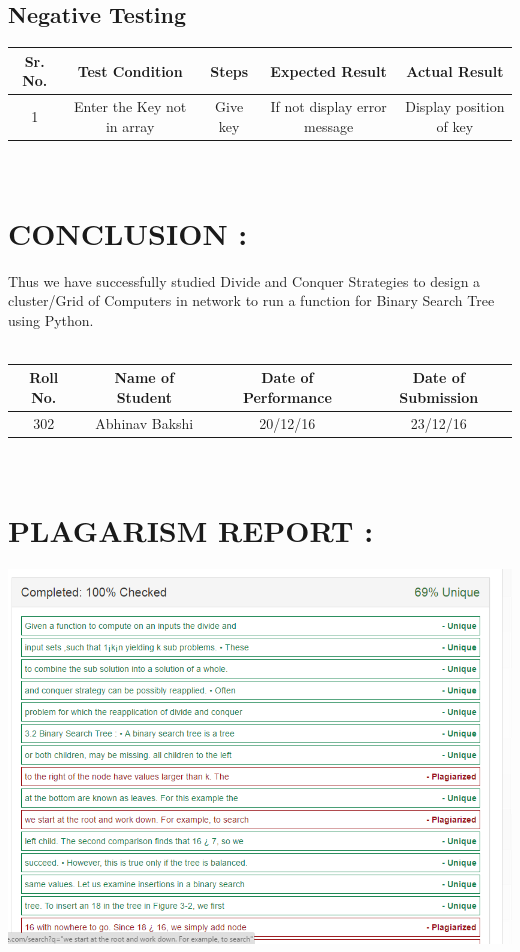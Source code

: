 \documentclass{article}
\begin{document}
\subsection{Negative Testing}
\begin{center}
	\begin{tabular}
		{|c|c|c|c|c|}\hline
		{\bf Sr. No.}		&{\bf Test Condition }	&{\bf Steps}	&{\bf Expected Result} & Actual Result \\ \hline
		{1}	&	{Enter the Key not in array}& {Give key}&  {If not display error message} & {Display position of key}\\
		\hline
		
	\end{tabular}\\ 
\end{center}

\section{CONCLUSION :}
Thus we have successfully studied Divide and Conquer Strategies to design a cluster/Grid of Computers in network to run a function for Binary Search Tree using Python.\\\\

\begin{center}
	\begin{tabular}
		{|c|c|c|c|}\hline
		{\bf Roll No.}		&{\bf Name of Student}		&{\bf Date of Performance}  				&{\bf Date of Submission}  \\ \hline
		{302}	&	{Abhinav Bakshi}& 	{20/12/16}	&  {23/12/16}\\ \hline
	\end{tabular}\\ 
\end{center}


\newpage
\section{PLAGARISM REPORT :}
	\includegraphics[width=\textwidth]{bst_plaga}
\end{document}
